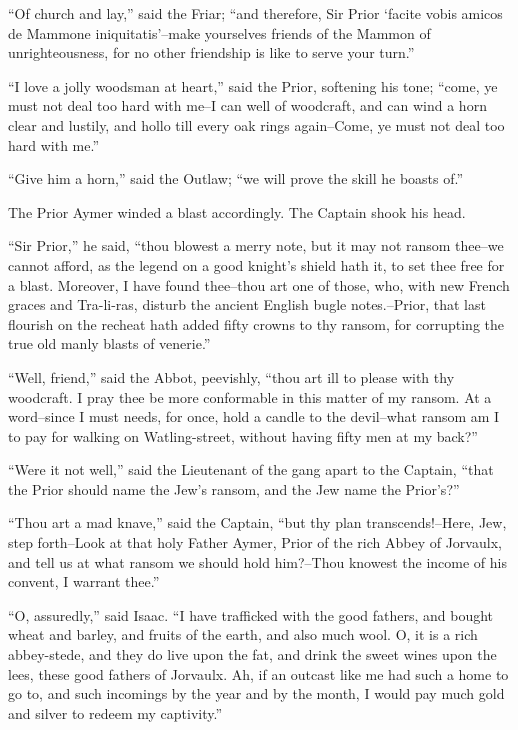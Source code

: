 ``Of church and lay,'' said the Friar; ``and therefore, Sir Prior
`facite vobis amicos de Mammone iniquitatis'--make yourselves friends of
the Mammon of unrighteousness, for no other friendship is like to serve
your turn.''

``I love a jolly woodsman at heart,'' said the Prior, softening his
tone; ``come, ye must not deal too hard with me--I can well of
woodcraft, and can wind a horn clear and lustily, and hollo till every
oak rings again--Come, ye must not deal too hard with me.''

``Give him a horn,'' said the Outlaw; ``we will prove the skill he
boasts of.''

The Prior Aymer winded a blast accordingly. The Captain shook his head.

``Sir Prior,'' he said, ``thou blowest a merry note, but it may not
ransom thee--we cannot afford, as the legend on a good knight's shield
hath it, to set thee free for a blast. Moreover, I have found thee--thou
art one of those, who, with new French graces and Tra-li-ras, disturb
the ancient English bugle notes.--Prior, that last flourish on the
recheat hath added fifty crowns to thy ransom, for corrupting the true
old manly blasts of venerie.''

``Well, friend,'' said the Abbot, peevishly, ``thou art ill to please
with thy woodcraft. I pray thee be more conformable in this matter of my
ransom. At a word--since I must needs, for once, hold a candle to the
devil--what ransom am I to pay for walking on Watling-street, without
having fifty men at my back?''

``Were it not well,'' said the Lieutenant of the gang apart to the
Captain, ``that the Prior should name the Jew's ransom, and the Jew name
the Prior's?''

``Thou art a mad knave,'' said the Captain, ``but thy plan
transcends!--Here, Jew, step forth--Look at that holy Father Aymer,
Prior of the rich Abbey of Jorvaulx, and tell us at what ransom we
should hold him?--Thou knowest the income of his convent, I warrant
thee.''

``O, assuredly,'' said Isaac. ``I have trafficked with the good fathers,
and bought wheat and barley, and fruits of the earth, and also much
wool. O, it is a rich abbey-stede, and they do live upon the fat, and
drink the sweet wines upon the lees, these good fathers of Jorvaulx. Ah,
if an outcast like me had such a home to go to, and such incomings by
the year and by the month, I would pay much gold and silver to redeem my
captivity.''

